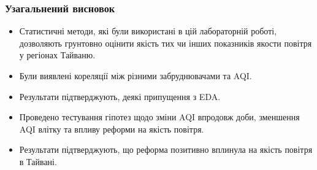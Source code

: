 \documentclass{beamer}
\begin{document}
\begin{frame}
  \frametitle{Узагальнений висновок}
  \begin{itemize}
    \item Статистичні методи, які були використані в цій лабораторній роботі,
    дозволяють грунтовно оцінити якість тих чи інших показників якости повітря у регіонах Тайваню.
    
    \item Були виявлені кореляції між різними забруднювачами та AQI.
   
    \item Результати підтверджують, деякі припущення з EDA.
    
    \item Проведено тестування гіпотез щодо зміни AQI впродовж доби, 
    зменшення AQI влітку та впливу реформи на якість повітря.

    \item Результати підтверджують, що реформа позитивно вплинула на якість повітря в Тайвані.
  \end{itemize}
  
\end{frame}
\end{document}
